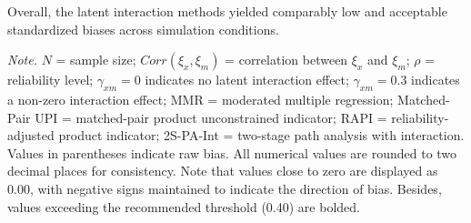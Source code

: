 \documentclass[
  man,mask]{apa6}
\newenvironment{lltable}{\begin{landscape}\centering\begin{ThreePartTable}}{\end{ThreePartTable}\end{landscape}}
\begin{document}
Overall, the latent interaction methods yielded comparably low and acceptable standardized biases across simulation conditions.

\begin{lltable}

\begin{TableNotes}[para]
\normalsize{\textit{Note.} $\textit{N}$ = sample size; $Corr(\xi_{x}, \xi_{m})$ = correlation between $\xi_{x}$ and $\xi_{m}$; $\rho$ = reliability level; $\gamma_{xm} = 0$ indicates no latent interaction effect; $\gamma_{xm} = 0.3$ indicates a non-zero interaction effect; MMR = moderated multiple regression; Matched-Pair UPI = matched-pair product unconstrained indicator; RAPI = reliability-adjusted product indicator; 2S-PA-Int = two-stage path analysis with interaction. Values in parentheses indicate raw bias. All numerical values are rounded to two decimal places for consistency. Note that values close to zero are displayed as 0.00, with negative signs maintained to indicate the direction of bias. Besides, values exceeding the recommended threshold (0.40) are bolded.}
\end{TableNotes}

\tiny{

}
\end{lltable}
\end{document}
